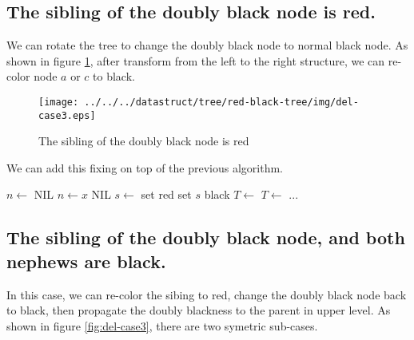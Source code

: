 \documentclass[UTF8]{article}
\begin{document}
\subsection{The sibling of the doubly black node is red.}

We can rotate the tree to change the doubly black node to normal black node. As shown in figure \ref{fig:del-case2}, after transform from the left to the right structure, we can re-color node $a$ or $c$ to black.

\begin{figure}[htbp]
  \centering
  \texttt{[image: ../../../datastruct/tree/red-black-tree/img/del-case3.eps]}
  \caption{The sibling of the doubly black node is red} \label{fig:del-case2}
\end{figure}

We can add this fixing on top of the previous algorithm.

\begin{algorithmic}[1]
  \State $n \gets$ NIL
    
    \State $n \gets x$
  \EndIf
   
    \State \Return NIL
  \EndIf
     
        \State $s \gets$ 
         
          \State set  red
          \State set $s$ black
           
            \State $T \gets$ 
          \Else {}
            \State $T \gets$ 
          \EndIf
          \State ...
        \EndIf
    \EndIf
  \EndWhile
\EndFunction
\end{algorithmic}

\subsection{The sibling of the doubly black node, and both nephews are black.}
In this case, we can re-color the sibing to red, change the doubly black node back to black, then propagate the doubly blackness to the parent in upper level. As shown in figure \ref{fig:del-case3}, there are two symetric sub-cases.
\end{document}
